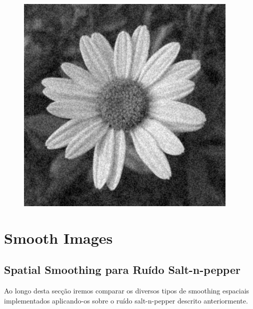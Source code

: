\documentclass[a4paper]{report}
\begin{document}
\begin{figure}[H]
\begin{minipage}{.3\textwidth}
\end{minipage}%
\begin{minipage}{.3\textwidth}
  \centering
  \includegraphics[width=0.95\textwidth]{images/Smooth/flower_gaussian_0.1.png}
\end{minipage}
\end{figure}

\chapter{Smooth Images}
\section{Spatial Smoothing para Ruído Salt-n-pepper}
Ao longo desta secção iremos comparar os diversos tipos de smoothing espaciais implementados aplicando-os sobre o ruído
salt-n-pepper descrito anteriormente.
\end{document}
